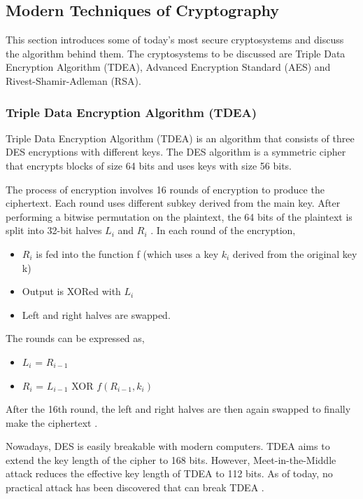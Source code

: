 \subsection{Modern Techniques of Cryptography}

This section introduces some of today's most secure cryptosystems and discuss the algorithm behind them. The cryptosystems to be discussed are Triple Data Encryption Algorithm (TDEA), Advanced Encryption Standard (AES) and Rivest-Shamir-Adleman (RSA).

\subsubsection{Triple Data Encryption Algorithm (TDEA)}

Triple Data Encryption Algorithm (TDEA) is an algorithm that consists of three DES encryptions with different keys. The DES algorithm is a symmetric cipher that encrypts blocks of size 64 bits and uses keys with size 56 bits.

The process of encryption involves 16 rounds of encryption to produce the ciphertext. Each round uses different subkey derived from the main key. After performing a bitwise permutation on the plaintext, the 64 bits of the plaintext is split into 32-bit halves ${L_i}$ and ${R_i}$ \cite{153}. In each round of the encryption, 

\begin{itemize}
    \item ${R_i}$ is fed into the function f (which uses a key ${k_i}$ derived from the original key k)
    \item Output is XORed with ${L_i}$
    \item Left and right halves are swapped.
\end{itemize}

The rounds can be expressed as, 
\begin{itemize}
    \item ${L_i}$ = ${R_{i-1}}$
    \item ${R_i}$ = ${L_{i-1}}$ XOR ${f(R_{i-1}, k_i)}$ 
\end{itemize}
    
After the 16th round, the left and right halves are then again swapped to finally make the ciphertext \cite{153}.

Nowadays, DES is easily breakable with modern computers. TDEA aims to extend the key length of the cipher to 168 bits. However, Meet-in-the-Middle attack reduces the effective key length of TDEA to 112 bits. As of today, no practical attack has been discovered that can break TDEA \cite{153}.

